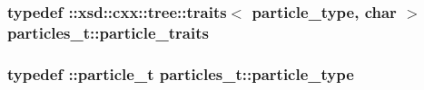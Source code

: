 \hypertarget{classparticles__t_adf7984716150a259981b7f262344ee9a}{
\subsubsection[{particle\-\_\-traits}]{\setlength{\rightskip}{0pt plus 5cm}typedef \-::xsd\-::cxx\-::tree\-::traits$<$ {\bf particle\-\_\-type}, char $>$ {\bf particles\-\_\-t\-::particle\-\_\-traits}}}\label{classparticles__t_adf7984716150a259981b7f262344ee9a}
\hypertarget{classparticles__t_af3204fae99711ad2c2e8fc73334219ef}{
\subsubsection[{particle\-\_\-type}]{\setlength{\rightskip}{0pt plus 5cm}typedef \-::{\bf particle\-\_\-t} {\bf particles\-\_\-t\-::particle\-\_\-type}}}\label{classparticles__t_af3204fae99711ad2c2e8fc73334219ef}


